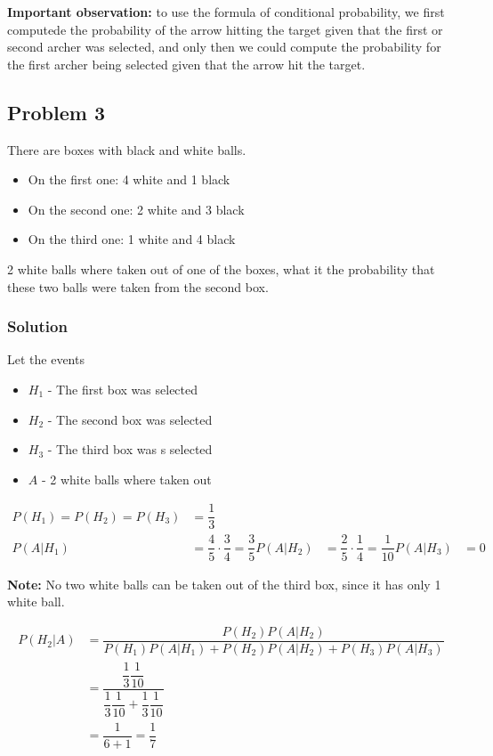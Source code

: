 \documentclass{article}
\begin{document}
\textbf{Important observation: } to use the formula of conditional probability, we first computede the probability of the arrow hitting the target given that the first or second archer was selected, and only then we could compute the probability for the first archer being selected given that the arrow hit the target.

\subsection*{Problem 3}

There are boxes with black and white balls.

\begin{itemize}
    \item On the first one: 4 white and 1 black
    \item On the second one: 2 white and 3 black
    \item On the third one: 1 white and 4 black
\end{itemize}

2 white balls where taken out of one of the boxes, what it the probability that these two balls were taken from the second box.

\subsubsection{Solution}

Let the events

\begin{itemize}
    \item $H_1$ - The first box was selected
    \item $H_2$ - The second box was selected
    \item $H_3$ - The third box was s
    selected
    \item $A$ - 2 white balls where taken out
\end{itemize}

\begin{align*}
    P(H_1) = P(H_2) = P(H_3) &= \dfrac{1}{3} \\
    P(A | H_1) &= \dfrac{4}{5} \cdot \dfrac{3}{4} = \dfrac{3}{5}
    P(A | H_2) &= \dfrac{2}{5} \cdot \dfrac{1}{4} = \dfrac{1}{10}
    P(A | H_3) &= 0
\end{align*}

\textbf{Note:} No two white balls can be taken out of the third box, since it has only 1 white ball.

\begin{align*}
    P(H_2 | A) &= \dfrac{P(H_2) P(A | H_2)}{P(H_1)P(A | H_1) + P(H_2)P(A | H_2) + P(H_3)P(A|H_3)} \\
    &= \dfrac{\dfrac{1}{3}\dfrac{1}{10}}{\dfrac{1}{3}\dfrac{1}{10} + \dfrac{1}{3} \dfrac{1}{10}} \\
    &= \dfrac{1}{6 + 1} = \dfrac{1}{7}
\end{align*}
\end{document}
